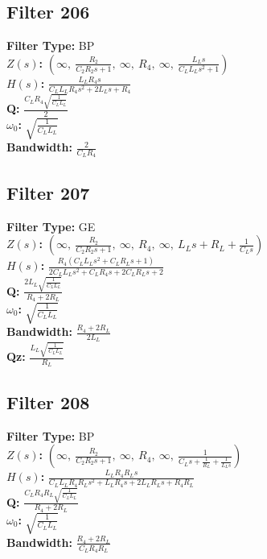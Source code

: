\documentclass{article}
\begin{document}
\subsection*{Filter 206}
\textbf{Filter Type:} BP \\ 
\textbf{$Z(s)$:} $\left( \infty, \  \frac{R_{2}}{C_{2} R_{2} s + 1}, \  \infty, \  R_{4}, \  \infty, \  \frac{L_{L} s}{C_{L} L_{L} s^{2} + 1}\right)$ \\ 
\textbf{$H(s)$:} $\frac{L_{L} R_{4} s}{C_{L} L_{L} R_{4} s^{2} + 2 L_{L} s + R_{4}}$ \\ 
\textbf{Q:} $\frac{C_{L} R_{4} \sqrt{\frac{1}{C_{L} L_{L}}}}{2}$ \\ 
\textbf{$\omega_0$:} $\sqrt{\frac{1}{C_{L} L_{L}}}$ \\ 
\textbf{Bandwidth:} $\frac{2}{C_{L} R_{4}}$ \\ 
\subsection*{Filter 207}
\textbf{Filter Type:} GE \\ 
\textbf{$Z(s)$:} $\left( \infty, \  \frac{R_{2}}{C_{2} R_{2} s + 1}, \  \infty, \  R_{4}, \  \infty, \  L_{L} s + R_{L} + \frac{1}{C_{L} s}\right)$ \\ 
\textbf{$H(s)$:} $\frac{R_{4} \left(C_{L} L_{L} s^{2} + C_{L} R_{L} s + 1\right)}{2 C_{L} L_{L} s^{2} + C_{L} R_{4} s + 2 C_{L} R_{L} s + 2}$ \\ 
\textbf{Q:} $\frac{2 L_{L} \sqrt{\frac{1}{C_{L} L_{L}}}}{R_{4} + 2 R_{L}}$ \\ 
\textbf{$\omega_0$:} $\sqrt{\frac{1}{C_{L} L_{L}}}$ \\ 
\textbf{Bandwidth:} $\frac{R_{4} + 2 R_{L}}{2 L_{L}}$ \\ 
\textbf{Qz:} $\frac{L_{L} \sqrt{\frac{1}{C_{L} L_{L}}}}{R_{L}}$ \\ 
\subsection*{Filter 208}
\textbf{Filter Type:} BP \\ 
\textbf{$Z(s)$:} $\left( \infty, \  \frac{R_{2}}{C_{2} R_{2} s + 1}, \  \infty, \  R_{4}, \  \infty, \  \frac{1}{C_{L} s + \frac{1}{R_{L}} + \frac{1}{L_{L} s}}\right)$ \\ 
\textbf{$H(s)$:} $\frac{L_{L} R_{4} R_{L} s}{C_{L} L_{L} R_{4} R_{L} s^{2} + L_{L} R_{4} s + 2 L_{L} R_{L} s + R_{4} R_{L}}$ \\ 
\textbf{Q:} $\frac{C_{L} R_{4} R_{L} \sqrt{\frac{1}{C_{L} L_{L}}}}{R_{4} + 2 R_{L}}$ \\ 
\textbf{$\omega_0$:} $\sqrt{\frac{1}{C_{L} L_{L}}}$ \\ 
\textbf{Bandwidth:} $\frac{R_{4} + 2 R_{L}}{C_{L} R_{4} R_{L}}$ \\ 
\end{document}
